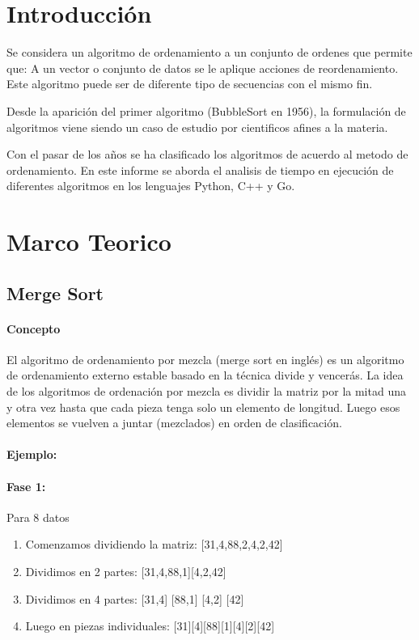 \documentclass{article}
\begin{document}
    \section{Introducción}
    Se considera un algoritmo de ordenamiento a un conjunto de ordenes que permite que: A un vector o conjunto de datos se le aplique acciones de reordenamiento. Este algoritmo puede ser de diferente tipo de secuencias con el mismo fin. 

    Desde la aparición del primer algoritmo (BubbleSort en 1956), la formulación de algoritmos viene siendo un caso de estudio por cientificos afines a la materia.

    Con el pasar de los años se ha clasificado los algoritmos de acuerdo al metodo de ordenamiento.
    En este informe se aborda el analisis de tiempo en ejecución de diferentes algoritmos en los lenguajes Python, C++ y Go.

    \section{Marco Teorico}
    \subsection{Merge Sort}
    \paragraph{ Concepto}El algoritmo de ordenamiento por mezcla (merge sort en inglés) es un algoritmo de ordenamiento externo estable basado en la técnica divide y vencerás. La idea de los algoritmos de ordenación por mezcla es dividir la matriz por la mitad una y otra vez hasta que cada pieza tenga solo un elemento de longitud. Luego esos elementos se vuelven a juntar (mezclados) en orden de clasificación.

    \paragraph{Ejemplo:}
    \paragraph{Fase 1:} Para 8 datos
    \begin{enumerate}
        \item Comenzamos dividiendo la matriz: [31,4,88,2,4,2,42]
        \item Dividimos en 2 partes: [31,4,88,1][4,2,42]
        \item Dividimos en 4 partes: [31,4] [88,1] [4,2] [42] 
        \item Luego en piezas individuales: [31][4][88][1][4][2][42]
    \end{enumerate}
\end{document}
